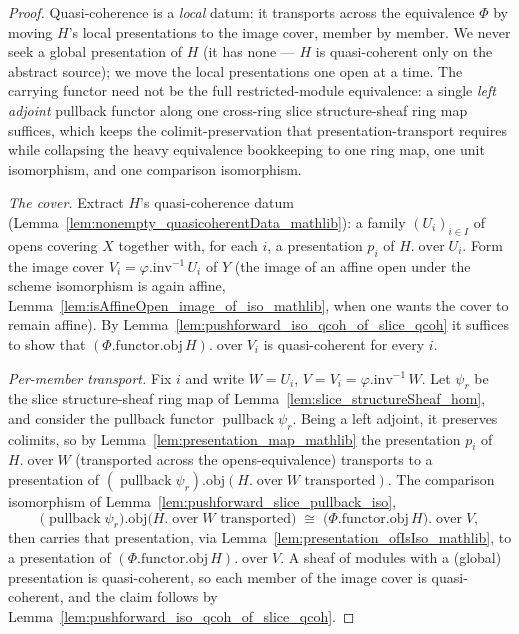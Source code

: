 \begin{proof}
    \leanok
  Quasi-coherence is a \emph{local} datum: it transports across the equivalence \(\Phi\) by moving
  \(H\)'s local presentations to the image cover, member by member. We never seek a global presentation
  of \(H\) (it has none — \(H\) is quasi-coherent only on the abstract source); we move the local
  presentations one open at a time. The carrying functor need not be the full
  restricted-module equivalence: a single \emph{left adjoint} pullback functor along one cross-ring
  slice structure-sheaf ring map suffices, which keeps the colimit-preservation that
  presentation-transport requires while collapsing the heavy equivalence bookkeeping to one ring map,
  one unit isomorphism, and one comparison isomorphism.

  \emph{The cover.} Extract \(H\)'s quasi-coherence datum
  (Lemma~\ref{lem:nonempty_quasicoherentData_mathlib}): a family \((U_i)_{i \in I}\) of opens covering
  \(X\) together with, for each \(i\), a presentation \(p_i\) of \(H.\operatorname{over} U_i\). Form the
  image cover \(V_i = \varphi.\mathrm{inv}^{-1}\,U_i\) of \(Y\) (the image of an affine open under the
  scheme isomorphism is again affine, Lemma~\ref{lem:isAffineOpen_image_of_iso_mathlib}, when one wants
  the cover to remain affine). By Lemma~\ref{lem:pushforward_iso_qcoh_of_slice_qcoh} it suffices to show
  that \((\Phi.\mathrm{functor}.\mathrm{obj}\, H).\operatorname{over} V_i\) is quasi-coherent for every
  \(i\).

  \emph{Per-member transport.} Fix \(i\) and write \(W = U_i\), \(V = V_i =
  \varphi.\mathrm{inv}^{-1}\,W\). Let \(\psi_r\) be the slice structure-sheaf ring map of
  Lemma~\ref{lem:slice_structureSheaf_hom}, and consider the pullback functor
  \(\operatorname{pullback}\psi_r\). Being a left adjoint, it preserves colimits, so by
  Lemma~\ref{lem:presentation_map_mathlib} the presentation \(p_i\) of \(H.\operatorname{over} W\)
  (transported across the opens-equivalence) transports to a presentation of
  \((\operatorname{pullback}\psi_r).\mathrm{obj}(H.\operatorname{over} W \text{ transported})\). The
  comparison isomorphism of Lemma~\ref{lem:pushforward_slice_pullback_iso},
  \[
    \bigl(\operatorname{pullback}\psi_r\bigr).\mathrm{obj}\bigl(H.\operatorname{over} W
      \text{ transported}\bigr)
      \;\cong\;
    \bigl(\Phi.\mathrm{functor}.\mathrm{obj}\, H\bigr).\operatorname{over} V,
  \]
  then carries that presentation, via Lemma~\ref{lem:presentation_ofIsIso_mathlib}, to a presentation of
  \((\Phi.\mathrm{functor}.\mathrm{obj}\, H).\operatorname{over} V\). A sheaf of modules with a (global)
  presentation is quasi-coherent, so each member of the image cover is quasi-coherent, and the claim
  follows by Lemma~\ref{lem:pushforward_iso_qcoh_of_slice_qcoh}.


\end{proof}
